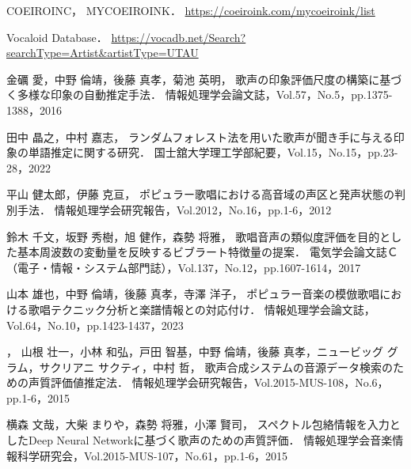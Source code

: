 \thispagestyle{myheadings}

\begin{thebibliography}{参考文献}

COEIROINC，
MYCOEIROINK．
\url{https://coeiroink.com/mycoeiroink/list}

Vocaloid Database．
\url{https://vocadb.net/Search?searchType=Artist&artistType=UTAU}




金礪 愛，中野 倫靖，後藤 真孝，菊池 英明，
歌声の印象評価尺度の構築に基づく多様な印象の自動推定手法．
情報処理学会論文誌，Vol.57，No.5，pp.1375-1388，2016

田中 晶之，中村 嘉志，
ランダムフォレスト法を用いた歌声が聞き手に与える印象の単語推定に関する研究．
国士舘大学理工学部紀要，Vol.15，No.15，pp.23-28，2022

平山 健太郎，伊藤 克亘，
ポピュラー歌唱における高音域の声区と発声状態の判別手法．
情報処理学会研究報告，Vol.2012，No.16，pp.1-6，2012

鈴木 千文，坂野 秀樹，旭 健作，森勢 将雅，
歌唱音声の類似度評価を目的とした基本周波数の変動量を反映するビブラート特徴量の提案．
電気学会論文誌Ｃ（電子・情報・システム部門誌），Vol.137，No.12，pp.1607-1614，2017

山本 雄也，中野 倫靖，後藤 真孝，寺澤 洋子，
ポピュラー音楽の模倣歌唱における歌唱テクニック分析と楽譜情報との対応付け．
情報処理学会論文誌，Vol.64，No.10，pp.1423-1437，2023

，
山根 壮一，小林 和弘，戸田 智基，中野 倫靖，後藤 真孝，ニュービッグ グラム，サクリアニ サクティ，中村 哲，
歌声合成システムの音源データ検索のための声質評価値推定法．
情報処理学会研究報告，Vol.2015-MUS-108，No.6，pp.1-6，2015

横森 文哉，大柴 まりや，森勢 将雅，小澤 賢司，
スペクトル包絡情報を入力としたDeep Neural Networkに基づく歌声のための声質評価．
情報処理学会音楽情報科学研究会，Vol.2015-MUS-107，No.61，pp.1-6，2015


\end{thebibliography}
